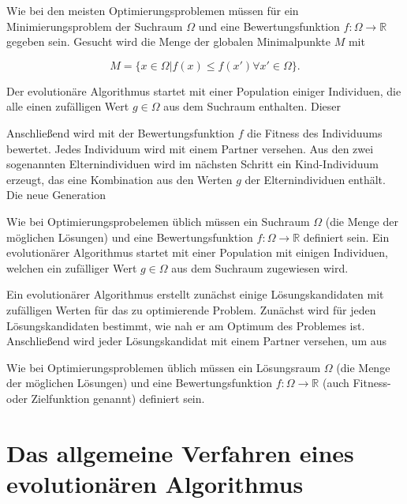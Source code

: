 Wie bei den meisten Optimierungsproblemen müssen für ein Minimierungsproblem der Suchraum $\Omega$ und eine Bewertungsfunktion $f: \Omega \to \mathbb{R}$ gegeben sein. Gesucht wird die Menge der globalen Minimalpunkte $M$ mit

\begin{equation}
M = \{x \in \Omega | f(x) \leq f(x') \forall x' \in \Omega \}.
\end{equation}

Der evolutionäre Algorithmus startet mit einer Population einiger Individuen, die alle einen zufälligen Wert $g \in \Omega$ aus dem Suchraum enthalten. Dieser 

Anschließend wird mit der Bewertungsfunktion $f$ die Fitness des Individuums bewertet. Jedes Individuum wird mit einem Partner versehen. Aus den zwei sogenannten Elternindividuen wird im nächsten Schritt ein Kind-Individuum erzeugt, das eine Kombination aus den Werten $g$ der Elternindividuen enthält. Die neue Generation

Wie bei Optimierungsprobelemen üblich müssen ein Suchraum $\Omega$ (die Menge der möglichen Lösungen) und eine Bewertungsfunktion $f: \Omega \to \mathbb{R}$ definiert sein. Ein evolutionärer Algorithmus startet mit einer Population mit einigen Individuen, welchen ein zufälliger Wert $g \in \Omega$ aus dem Suchraum zugewiesen wird. 

Ein evolutionärer Algorithmus erstellt zunächst einige Lösungskandidaten mit zufälligen Werten für das zu optimierende Problem. Zunächst wird für jeden Lösungskandidaten bestimmt, wie nah er am Optimum des Problemes ist. Anschließend wird jeder Lösungskandidat mit einem Partner versehen, um aus 

Wie bei Optimierungsproblemen üblich müssen ein Lösungsraum $\Omega$ (die Menge der möglichen Lösungen) und eine Bewertungsfunktion $f: \Omega \to \mathbb{R}$ (auch Fitness- oder Zielfunktion genannt) definiert sein. 











\section{Das allgemeine Verfahren eines evolutionären Algorithmus}


